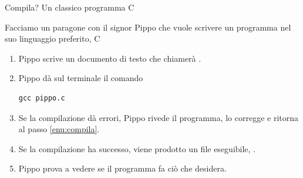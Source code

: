 \documentclass{beamer}
\begin{document}

\begin{frame}[fragile]{Compila? Un classico programma C}

Facciamo un paragone con il signor Pippo che vuole scrivere un programma
nel suo linguaggio preferito, C

\bigskip{}
\begin{enumerate}
\item Pippo scrive un documento di testo che chiamer\`a .
\item \label{enu:compila}Pippo d\`a sul terminale il comando
\begin{verbatim}
gcc pippo.c
\end{verbatim}
\item Se la compilazione d\`a errori, Pippo rivede il programma, lo corregge
e ritorna al passo \ref{enu:compila}.
\item Se la compilazione ha successo, viene prodotto un file eseguibile,
.
\item Pippo prova a vedere se il programma fa ci\`o che desidera.
\end{enumerate}
\end{frame}
\end{document}
